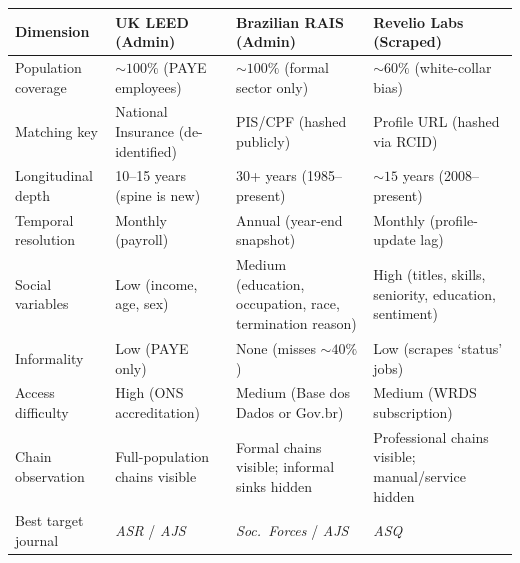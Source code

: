 \documentclass[a4paper]{tufte-handout}
\begin{document}
\begin{fullwidth}
	\smallskip
	\small
	\begin{tabularx}{\linewidth}{@{}l X X X@{}}
		\toprule
		\textbf{Dimension}  & \textbf{UK LEED (Admin)}           & \textbf{Brazilian RAIS (Admin)}                          & \textbf{Revelio Labs (Scraped)}                        \\
		\midrule
		Population coverage & ${\sim}100\%$ (PAYE employees)     & ${\sim}100\%$ (formal sector only)                       & ${\sim}60\%$ (white-collar bias)                       \\[3pt]
		Matching key        & National Insurance (de-identified) & PIS/CPF (hashed publicly)                                & Profile URL (hashed via RCID)                          \\[3pt]
		Longitudinal depth  & 10--15 years (spine is new)        & 30+ years (1985--present)                                & ${\sim}15$ years (2008--present)                       \\[3pt]
		Temporal resolution & Monthly (payroll)                  & Annual (year-end snapshot)                               & Monthly (profile-update lag)                           \\[3pt]
		Social variables    & Low (income, age, sex)             & Medium (education, occupation, race, termination reason) & High (titles, skills, seniority, education, sentiment) \\[3pt]
		Informality         & Low (PAYE only)                    & None (misses ${\sim}40\%$)                               & Low (scrapes `status' jobs)                            \\[3pt]
		Access difficulty   & High (ONS accreditation)           & Medium (Base dos Dados or Gov.br)                        & Medium (WRDS subscription)                             \\[3pt]
		Chain observation   & Full-population chains visible     & Formal chains visible; informal sinks hidden             & Professional chains visible; manual/service hidden     \\[3pt]
		Best target journal & \emph{ASR} / \emph{AJS}            & \emph{Soc.\ Forces} / \emph{AJS}                         & \emph{ASQ}                                             \\
		\bottomrule
	\end{tabularx}
	\smallskip
\end{fullwidth}


\end{document}
